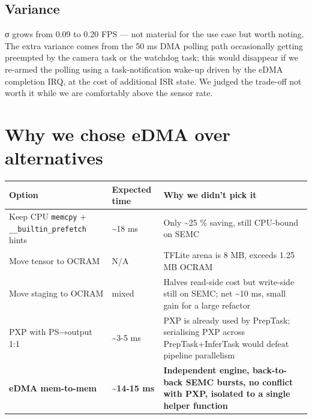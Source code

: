 \subsection{Variance}\label{variance}

σ grows from 0.09 to 0.20 FPS --- not material for the use case but
worth noting. The extra variance comes from the 50 ms DMA polling path
occasionally getting preempted by the camera task or the watchdog task;
this would disappear if we re-armed the polling using a
task-notification wake-up driven by the eDMA completion IRQ, at the cost
of additional ISR state. We judged the trade-off not worth it while we
are comfortably above the sensor rate.

\section{Why we chose eDMA over
alternatives}\label{why-we-chose-edma-over-alternatives}

{\def\LTcaptype{none} %
\begin{longtable}[]{@{}
  >{\raggedright\arraybackslash}p{}
  >{\raggedleft\arraybackslash}p{}
  >{\raggedright\arraybackslash}p{}@{}}
\toprule\noalign{}
\begin{minipage}[b]{\linewidth}\raggedright
Option
\end{minipage} & \begin{minipage}[b]{\linewidth}\raggedleft
Expected time
\end{minipage} & \begin{minipage}[b]{\linewidth}\raggedright
Why we didn't pick it
\end{minipage} \\
\midrule\noalign{}
\endhead
\bottomrule\noalign{}
\endlastfoot
Keep CPU \texttt{memcpy} + \texttt{\_\_builtin\_prefetch} hints &
\textasciitilde18 ms & Only \textasciitilde25 \% saving, still CPU-bound
on SEMC \\
Move tensor to OCRAM & N/A & TFLite arena is 8 MB, exceeds 1.25 MB
OCRAM \\
Move staging to OCRAM & mixed & Halves read-side cost but write-side
still on SEMC; net \textasciitilde10 ms, small gain for a large
refactor \\
PXP with PS→output 1:1 & \textasciitilde3-5 ms & PXP is already used by
PrepTask; serialising PXP across PrepTask+InferTask would defeat
pipeline parallelism \\
\textbf{eDMA mem-to-mem} & \textbf{\textasciitilde14-15 ms} &
\textbf{Independent engine, back-to-back SEMC bursts, no conflict with
PXP, isolated to a single helper function} \\
\end{longtable}
}

